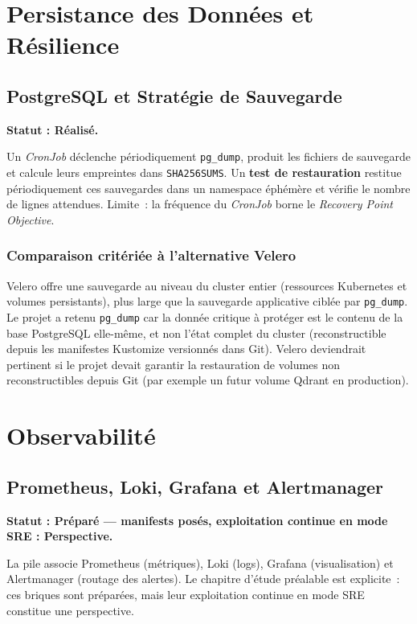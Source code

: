 \section{Persistance des Données et Résilience}

\subsection{PostgreSQL et Stratégie de Sauvegarde}
\textbf{Statut : Réalisé.}

Un \textit{CronJob} déclenche périodiquement \texttt{pg\_dump}, produit les fichiers de sauvegarde et calcule leurs empreintes dans \texttt{SHA256SUMS}. Un \textbf{test de restauration} restitue périodiquement ces sauvegardes dans un namespace éphémère et vérifie le nombre de lignes attendues. Limite~: la fréquence du \textit{CronJob} borne le \textit{Recovery Point Objective}.

\subsubsection{Comparaison critériée à l'alternative Velero}
Velero offre une sauvegarde au niveau du cluster entier (ressources Kubernetes et volumes persistants), plus large que la sauvegarde applicative ciblée par \texttt{pg\_dump}. Le projet a retenu \texttt{pg\_dump} car la donnée critique à protéger est le contenu de la base PostgreSQL elle-même, et non l'état complet du cluster (reconstructible depuis les manifestes Kustomize versionnés dans Git). Velero deviendrait pertinent si le projet devait garantir la restauration de volumes non reconstructibles depuis Git (par exemple un futur volume Qdrant en production).

\section{Observabilité}

\subsection{Prometheus, Loki, Grafana et Alertmanager}
\textbf{Statut : Préparé — manifests posés, exploitation continue en mode SRE : Perspective.}

La pile associe Prometheus (métriques), Loki (logs), Grafana (visualisation) et Alertmanager (routage des alertes). Le chapitre d'étude préalable est explicite~: ces briques sont préparées, mais leur exploitation continue en mode SRE constitue une perspective.

